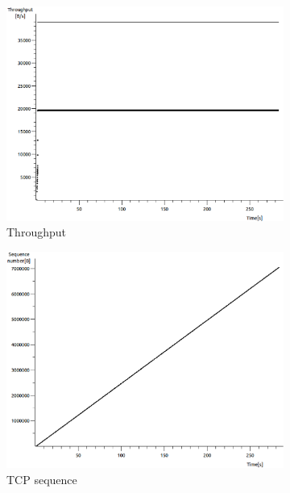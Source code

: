 \documentclass[conference,a4paper]{IEEEtran}
\begin{document}
\begin{figure}
 \centering
 \begin{subfigure}[b]{0.2\textwidth}
  \includegraphics[width=\textwidth]{s1-1_thru}
  \caption{Throughput}
 \end{subfigure}
 \begin{subfigure}[b]{0.2\textwidth}
  \includegraphics[width=\textwidth]{s1-1_seq}
  \caption{TCP sequence}
 \end{subfigure}
 \begin{subfigure}[b]{0.2\textwidth}

\end{subfigure}
\end{figure}
\end{document}
